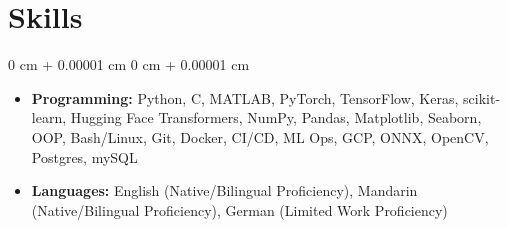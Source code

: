 \documentclass[10pt, letterpaper]{article}
\newenvironment{highlights}{
    \begin{itemize}[
        topsep=0.08 cm,
        parsep=0.08 cm,
        partopsep=0pt,
        itemsep=0pt,
        leftmargin=0.2 cm + 17pt
    ]
}
{
    \end{itemize}
}
\newenvironment{onecolentry}{
    \begin{adjustwidth}{
        0 cm + 0.00001 cm
    }{
        0 cm + 0.00001 cm
    }
}{
    \end{adjustwidth}
}
\begin{document}
\section{Skills}
\vspace{0.08 cm}
\begin{onecolentry}
    \begin{highlights}
        \item \textbf{Programming:} Python, C, MATLAB, PyTorch, TensorFlow, Keras, scikit-learn, Hugging Face Transformers, NumPy, Pandas, Matplotlib, Seaborn, OOP, Bash/Linux, Git, Docker, CI/CD, ML Ops, GCP, ONNX, OpenCV, Postgres, mySQL
        \item \textbf{Languages:} English (Native/Bilingual Proficiency), Mandarin (Native/Bilingual Proficiency), German (Limited Work Proficiency)
    \end{highlights}
\end{onecolentry}
\end{document}
